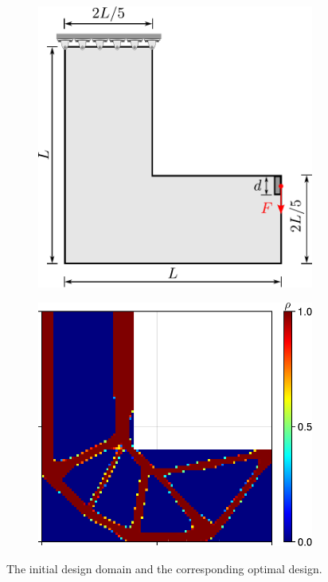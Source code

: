 \documentclass{article} %
\begin{document}
\begin{figure}[H] 
	\centering
	\begin{subfigure}{0.4\textwidth} \centering
		\includegraphics[scale=0.35]{Lbracket2d.pdf}
		\caption{}
	\end{subfigure}
	\begin{subfigure}{0.4\textwidth} \centering
		\includegraphics[scale=0.4]{Lbracket2d_TOP.pdf}
		\caption{}
	\end{subfigure}
	\caption{The initial design domain and the corresponding optimal design.}
	\label{Fig_Lbracket2d}
\end{figure}
\end{document}

